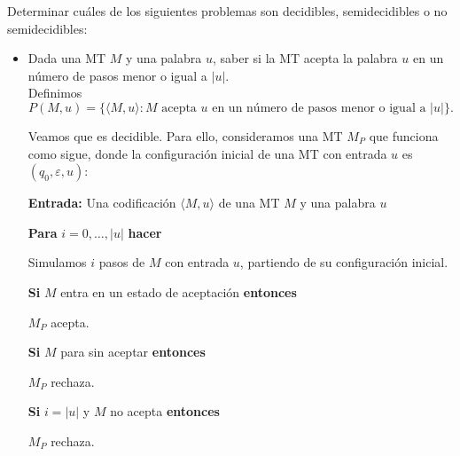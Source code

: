\begin{ejercicio}
    Determinar cuáles de los siguientes problemas son decidibles, semidecidibles o no semidecidibles:
    \begin{itemize}
        \item[a)] Dada una MT $M$ y una palabra $u$, saber si la MT acepta la palabra $u$ en un número de pasos menor o igual a $|u|$. \\
        
        Definimos $$P(M,u)=\{\langle M,u\rangle : M \text{ acepta } u \text{ en un número de pasos menor o igual a } |u|\}.$$

        Veamos que es decidible. Para ello, consideramos una MT $M_P$ que funciona como sigue, donde la configuración inicial de una MT con entrada $u$ es $(q_0,\varepsilon,u)$:

        \begin{algorithm}
        \caption{MT $M_{P}$}
        \label{algorithm:acepta-u-en-leq-longitud}
        \begin{algorithmic}
            \State \textbf{Entrada:} Una codificación $\langle M,u \rangle$ de una MT $M$ y una palabra $u$

            \State \textbf{Para} $i = 0, \ldots, |u|$ \textbf{hacer}

                \State \hspace{1cm} Simulamos $i$ pasos de $M$ con entrada $u$, partiendo de su configuración inicial.

                \State \hspace{1cm} \textbf{Si} $M$ entra en un estado de aceptación \textbf{entonces} 
                
                \State \hspace{2cm} $M_P$ acepta.

                \State \hspace{1cm} \textbf{Si} $M$ para sin aceptar \textbf{entonces} 

                \State \hspace{2cm} $M_P$ rechaza.

                \State \hspace{1cm} \textbf{Si} $i = |u|$ y $M$ no acepta \textbf{entonces} 
                
                \State \hspace{2cm} $M_P$ rechaza.
        \end{algorithmic}
        \end{algorithm}


\end{itemize}
\end{ejercicio}
